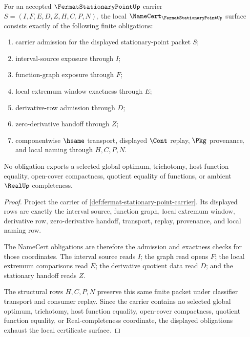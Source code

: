\begin{theorem}
\label{thm:fermat-stationary-point-namecert-obligations}
For an accepted $\FermatStationaryPointUp$ carrier $S=(I,F,E,D,Z,H,C,P,N)$, the local $\NameCert_{\FermatStationaryPointUp}$ surface consists exactly of the following finite obligations:
\begin{enumerate}
\item carrier admission for the displayed stationary-point packet $S$;
\item interval-source exposure through $I$;
\item function-graph exposure through $F$;
\item local extremum window exactness through $E$;
\item derivative-row admission through $D$;
\item zero-derivative handoff through $Z$;
\item componentwise $\hsame$ transport, displayed $\Cont$ replay, $\Pkg$ provenance, and local naming through $H,C,P,N$.
\end{enumerate}
No obligation exports a selected global optimum, trichotomy, host function equality, open-cover compactness, quotient equality of functions, or ambient $\RealUp$ completeness.
\end{theorem}
\begin{proof}
Project the carrier of \autoref{def:fermat-stationary-point-carrier}. Its displayed rows are exactly the interval source, function graph, local extremum window, derivative row, zero-derivative handoff, transport, replay, provenance, and local naming row.

The NameCert obligations are therefore the admission and exactness checks for those coordinates. The interval source reads $I$; the graph read opens $F$; the local extremum comparisons read $E$; the derivative quotient data read $D$; and the stationary handoff reads $Z$.

The structural rows $H,C,P,N$ preserve this same finite packet under classifier transport and consumer replay. Since the carrier contains no selected global optimum, trichotomy, host function equality, open-cover compactness, quotient function equality, or Real-completeness coordinate, the displayed obligations exhaust the local certificate surface.
\end{proof}

